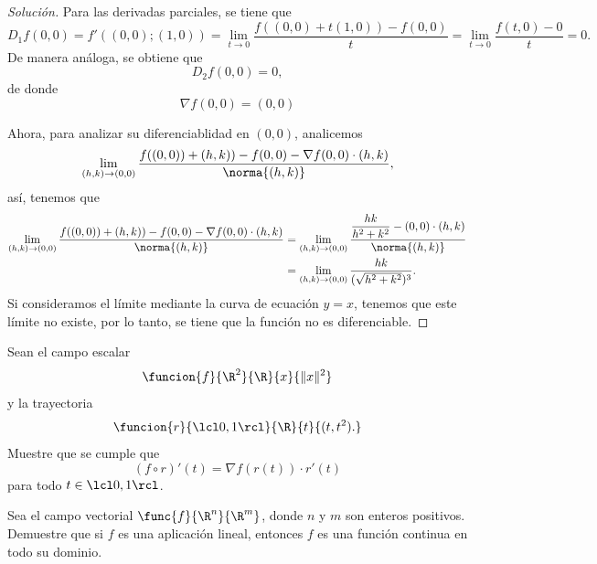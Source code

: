 \documentclass[a4,11pt]{aleph-notas}
\begin{document}
\begin{proof}[Solución]
Para las derivadas parciales, se tiene que
    \[
        D_1f(0,0)
        = f'((0,0);(1,0))
        = \lim_{t\to 0} \frac{f((0,0)+t(1,0))-f(0,0)}{t}
        = \lim_{t\to 0} \frac{f(t,0)-0}{t} = 0.
    \]
    De manera análoga, se obtiene que
    \[
        D_2f(0,0) = 0,
    \]
    de donde
    \[
        \nabla f(0,0)=(0,0)
    \]
    
    Ahora, para analizar su diferenciablidad en $(0,0)$, analicemos 
    \[
        \lim_{(h,k)\to (0,0)}\frac{f((0,0))+(h,k))-f(0,0)-\nabla f(0,0)\cdot (h,k)} {\norma{(h,k)}},
    \]
    así, tenemos que
    \begin{align*}
        \lim_{(h,k)\to (0,0)}\frac{f((0,0))+(h,k))-f(0,0)-\nabla f(0,0)\cdot (h,k)} {\norma{(h,k)}}
            & =  \lim_{(h,k)\to (0,0)}\frac{\dfrac{hk}{h^2+k^2}-(0,0)\cdot (h,k)}{\norma{(h,k)}}\\
            & =  \lim_{(h,k)\to (0,0)}\frac{hk}{(\sqrt{h^2+k^2})^3}.
    \end{align*}
    Si consideramos el límite mediante la curva de ecuación $y=x$, tenemos que este límite no existe, por lo tanto, se tiene que la función no es diferenciable.
\end{proof}

\begin{ejer}
Sean el campo escalar
	\[
		\funcion{f}{\R^2}{\R}{x}{\|x\|^2}
	\]
	y la trayectoria
	\[
		\funcion{r}{\lcl0,1\rcl}{\R}{t}{(t,t^2).}
	\]
	Muestre que se cumple que
	\[
		(f\circ r)'(t)=\nabla f(r(t))\cdot r'(t)
	\]
	para todo $t\in \lcl0,1\rcl$.
\end{ejer}

\begin{ejer}
Sea el campo vectorial $\func{f}{\R^n}{\R^m}$, donde $n$ y $m$ son enteros positivos. Demuestre que si $f$ es una aplicación lineal, entonces $f$ es una función continua en todo su dominio.
\end{ejer}
\end{document}
